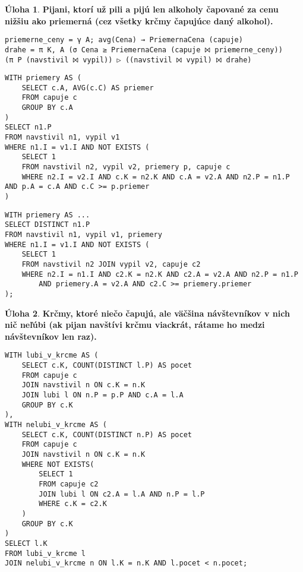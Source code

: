 \documentclass[10pt, a4paper]{article}
\theoremstyle{definition}
\newtheorem{problem}{Úloha}[section]
\def\beginwrong{\color{red!85!black}}
\def\endwrong{\color{black}}
\begin{document}
\begin{problem}
{\bf Pijani, ktorí už pili a pijú len alkoholy čapované za cenu nižšiu ako priemerná (cez všetky krčmy čapujúce daný alkohol).}\\[5mm]

\begin{verbatim}
priemerne_ceny = γ A; avg(Cena) → PriemernaCena (capuje)
drahe = π K, A (σ Cena ≥ PriemernaCena (capuje ⨝ priemerne_ceny))
(π P (navstivil ⨝ vypil)) ▷ ((navstivil ⨝ vypil) ⨝ drahe)
\end{verbatim}

\begin{verbatim}
WITH priemery AS (
    SELECT c.A, AVG(c.C) AS priemer
    FROM capuje c
    GROUP BY c.A
)
SELECT n1.P
FROM navstivil n1, vypil v1
WHERE n1.I = v1.I AND NOT EXISTS (
    SELECT 1
    FROM navstivil n2, vypil v2, priemery p, capuje c
    WHERE n2.I = v2.I AND c.K = n2.K AND c.A = v2.A AND n2.P = n1.P AND p.A = c.A AND c.C >= p.priemer
)
\end{verbatim}

\beginwrong
\begin{verbatim}
WITH priemery AS ...
SELECT DISTINCT n1.P
FROM navstivil n1, vypil v1, priemery
WHERE n1.I = v1.I AND NOT EXISTS (
    SELECT 1
    FROM navstivil n2 JOIN vypil v2, capuje c2
    WHERE n2.I = n1.I AND c2.K = n2.K AND c2.A = v2.A AND n2.P = n1.P
        AND priemery.A = v2.A AND c2.C >= priemery.priemer
);
\end{verbatim}
\endwrong

\end{problem}



\begin{problem}
{\bf Krčmy, ktoré niečo čapujú, ale väčšina návštevníkov v nich nič neľúbi (ak pijan navštívi krčmu viackrát, rátame ho medzi návštevníkov len raz).}\\[5mm]

\begin{verbatim}
WITH lubi_v_krcme AS (
    SELECT c.K, COUNT(DISTINCT l.P) AS pocet
    FROM capuje c
    JOIN navstivil n ON c.K = n.K
    JOIN lubi l ON n.P = p.P AND c.A = l.A
    GROUP BY c.K
),
WITH nelubi_v_krcme AS (
    SELECT c.K, COUNT(DISTINCT n.P) AS pocet
    FROM capuje c
    JOIN navstivil n ON c.K = n.K
    WHERE NOT EXISTS(
        SELECT 1
        FROM capuje c2
        JOIN lubi l ON c2.A = l.A AND n.P = l.P
        WHERE c.K = c2.K
    )
    GROUP BY c.K
)
SELECT l.K
FROM lubi_v_krcme l
JOIN nelubi_v_krcme n ON l.K = n.K AND l.pocet < n.pocet;
\end{verbatim}
\end{problem}
\end{document}
